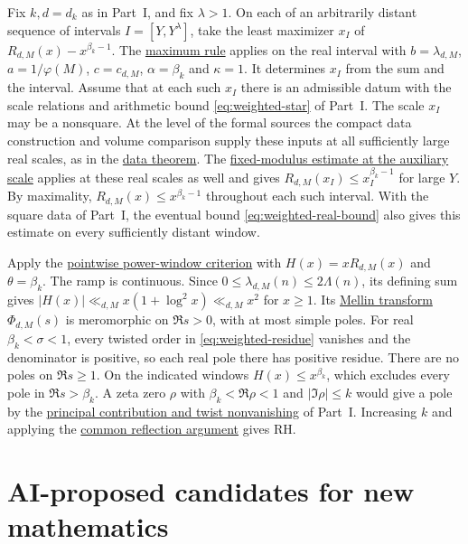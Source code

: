 \documentclass[11pt,a4paper]{article}
\DeclareRobustCommand{\teamanchor}[1]{%
  \ifmmode
    \hbox{\hypertarget{#1}{}}%
  \else
    \ifvmode
      \AddToHookNext{para/begin}{\hypertarget{#1}{}}%
    \else
      \hypertarget{#1}{}%
    \fi
  \fi
}
\begin{document}
\teamanchor{proof.weighted-window-variant}%
Fix \(k,d=d_k\) as in Part~I, and fix \(\lambda>1\). On each of an
arbitrarily distant sequence of intervals \(I=[Y,Y^\lambda]\), take the
least maximizer \(x_I\) of \(R_{d,M}(x)-x^{\beta_k-1}\). The
\hyperlink{proof.centered-ramp-maximum}{maximum rule} applies on the
real interval with \(b=\lambda_{d,M}\), \(a=1/\varphi(M)\),
\(c=c_{d,M}\), \(\alpha=\beta_k\) and \(\kappa=1\). It determines
\(x_I\) from the sum and the interval. Assume that at each such \(x_I\) there is an
admissible datum with the scale relations and arithmetic bound
\eqref{eq:weighted-star} of Part~I. The scale \(x_I\) may be a nonsquare.
At the level of the formal sources the compact data construction and
volume comparison supply these inputs at all sufficiently large real
scales, as in the \hyperlink{proof.weighted-data}{data theorem}.
The \hyperlink{proof.weighted-second-scale}{fixed-modulus estimate at
the auxiliary scale} applies at these real scales as well and gives
\(R_{d,M}(x_I)\le x_I^{\beta_k-1}\) for large \(Y\). By maximality,
\(R_{d,M}(x)\le x^{\beta_k-1}\) throughout each such interval. With the
square data of Part~I, the eventual bound \eqref{eq:weighted-real-bound}
also gives this estimate on every sufficiently distant window.

Apply the \hyperlink{proof.one-sided-power-window-bound}{pointwise
power-window criterion} with \(H(x)=xR_{d,M}(x)\) and
\(\theta=\beta_k\). The ramp is continuous. Since
\(0\le\lambda_{d,M}(n)\le2\Lambda(n)\), its defining sum gives
\(\lvert H(x)\rvert\ll_{d,M}x(1+\log^2 x)\ll_{d,M}x^2\) for \(x\ge1\).
Its \hyperlink{proof.weighted-polar}{Mellin transform}
\(\Phi_{d,M}(s)\) is meromorphic on \(\Re s>0\), with at most
simple poles. For real \(\beta_k<\sigma<1\), every twisted order in
\eqref{eq:weighted-residue} vanishes and the denominator is positive,
so each real pole there has positive residue. There are no poles on
\(\Re s\ge1\). On the indicated windows \(H(x)\le x^{\beta_k}\),
which excludes every pole in \(\Re s>\beta_k\). A zeta zero \(\rho\)
with \(\beta_k<\Re\rho<1\) and \(|\Im\rho|\le k\) would give a pole
by the \hyperlink{proof.weighted-rh}{principal contribution and twist
nonvanishing} of Part~I. Increasing \(k\) and applying the
\hyperlink{proof.zeta-reflection}{common reflection argument} gives RH.

\clearpage
\part{AI-proposed candidates for new mathematics}
\label{part:candidates}
\end{document}
